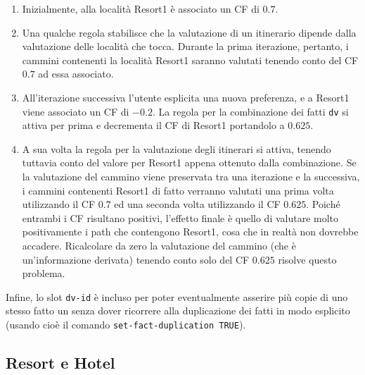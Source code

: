 \begin{enumerate}
\item Inizialmente, alla località Resort1 è associato un CF di $0.7$.
\item Una qualche regola stabilisce che la valutazione di un itinerario dipende dalla valutazione delle località che tocca. Durante la prima iterazione, pertanto, i cammini contenenti la località Resort1 saranno valutati tenendo conto del CF $0.7$ ad essa associato.
\item All'iterazione successiva l'utente esplicita una nuova preferenza, e a Resort1 viene associato un CF di $-0.2$. La regola per la combinazione dei fatti \texttt{dv} si attiva per prima e decrementa il CF di Resort1 portandolo a $0.625$.
\item A sua volta la regola per la valutazione degli itinerari si attiva, tenendo tuttavia conto del valore per Resort1 appena ottenuto dalla combinazione. Se la valutazione del cammino viene preservata tra una iterazione e la successiva, i cammini contenenti Resort1 di fatto verranno valutati una prima volta utilizzando il CF $0.7$ ed una seconda volta utilizzando il CF $0.625$. Poiché entrambi i CF risultano positivi, l'effetto finale è quello di valutare molto positivamente i path che contengono Resort1, cosa che in realtà non dovrebbe accadere. Ricalcolare da zero la valutazione del cammino (che è un'informazione derivata) tenendo conto solo del CF $0.625$ risolve questo problema.
\end{enumerate}
  
Infine, lo slot \texttt{dv-id} è incluso per poter eventualmente asserire più copie di uno stesso fatto un senza dover ricorrere alla duplicazione dei fatti in modo esplicito (usando cioè il comando \texttt{set-fact-duplication TRUE}).

\subsection{Resort e Hotel}

